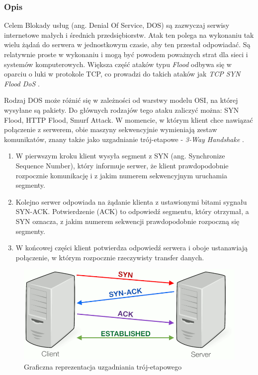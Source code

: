 \documentclass[12pt,twoside]{article}
\begin{document}
\subsubsection{Opis}
Celem Blokady usług (ang. Denial Of Service, DOS) są zazwyczaj serwisy internetowe małych i średnich przedsiębiorstw. Atak ten polega na wykonaniu tak wielu żądań do serwera w jednostkowym czasie, aby ten przestał odpowiadać. Są relatywnie proste w wykonaniu i mogą być powodem poważnych strat dla sieci i systemów komputerowych. Większa część ataków typu \emph{Flood} odbywa się w oparciu o luki w protokole TCP, co prowadzi do takich ataków jak \emph{TCP SYN Flood DoS} \cite{Ddos}.

Rodzaj DOS może różnić się w zależności od warstwy modelu OSI, na której wysyłane są pakiety. Do głównych rodzajów tego ataku zaliczyć można: SYN Flood, HTTP Flood, Smurf Attack. W momencie, w którym klient chce nawiązać połączenie z serwerem, obie maszyny sekwencyjnie wymieniają zestaw komunikatów, znany także jako uzgadnianie trój-etapowe - \emph{3-Way Handshake} \cite{3WayHandshake}. 

\begin{enumerate}
	\item W pierwszym kroku klient wysyła segment z SYN (ang. Synchronize Sequence Number), który informuje serwer, że klient prawdopodobnie rozpocznie komunikację i z jakim numerem sekwencyjnym uruchamia segmenty.
	\item Kolejno serwer odpowiada na żądanie klienta z ustawionymi bitami sygnału SYN-ACK. Potwierdzenie (ACK) to odpowiedź segmentu, który otrzymał, a SYN oznacza, z jakim numerem sekwencji prawdopodobnie rozpoczną się segmenty.
	\item W końcowej części klient potwierdza odpowiedź serwera i oboje ustanawiają połączenie, w którym rozpocznie rzeczywisty transfer danych.
\end{enumerate}


\begin{figure}[H]
	\centering
	\includegraphics[width=0.7\linewidth]{figures/3-way-handshake}
	\caption{Graficzna reprezentacja uzgadniania trój-etapowego \cite{ThreeWayHandshakePicture}}
	\label{fig:3-way-handshake}
\end{figure}
\end{document}
